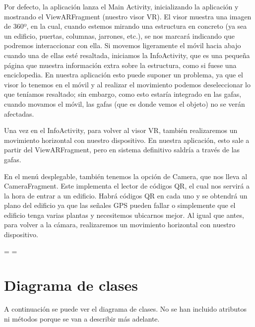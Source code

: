 \documentclass[11pt,a4paper]{article}
\begin{document}
Por defecto, la aplicación lanza el Main Activity, inicializando la aplicación y mostrando el ViewARFragment (nuestro visor VR). El
visor muestra una imagen de 360º, en la cual, cuando estemos mirando una estructura en concreto (ya sea un edificio, puertas, columnas,
jarrones, etc.), se nos marcará indicando que podremos interaccionar con ella. Si movemos ligeramente el móvil hacia abajo cuando una de
ellas esté resaltada, iniciamos la InfoActivity, que es una pequeña página que muestra información extra sobre la estructura, como si fuese
una enciclopedia. En nuestra aplicación esto puede suponer un problema, ya que el visor lo tenemos en el móvil y al realizar el movimiento
podemos deseleccionar lo que teníamos resaltado; sin embargo, como esto estaría integrado en las gafas, cuando movamos el móvil, las gafas
(que es donde vemos el objeto) no se verán afectadas.

Una vez en el InfoActivity, para volver al visor VR, también realizaremos un movimiento horizontal con nuestro dispositivo. En nuestra
aplicación, esto sale a partir del ViewARFragment, pero en sistema definitivo saldría a través de las gafas.

En el menú desplegable, también tenemos la opción de Camera, que nos lleva al CameraFragment. Este implementa el lector de códigos QR, el
cual nos servirá a la hora de entrar a un edificio. Habrá códigos QR en cada uno y se obtendrá un plano del edificio ya que las señales
GPS pueden fallar o simplemente que el edificio tenga varias plantas y necesitemos ubicarnos mejor. Al igual que antes, para volver a la
cámara, realizaremos un movimiento horizontal con nuestro dispositivo.


%

\recalctypearea
\pdfpageheight=\paperheight
\pdfpagewidth=\paperwidth
\pagestyle{lscape}

\newpage

\section{Diagrama de clases}

A continuación se puede ver el diagrama de clases. No se han incluido atributos ni métodos porque se van a describir más adelante.
\end{document}

